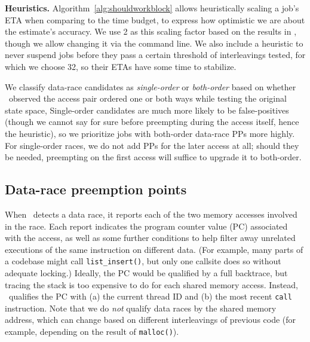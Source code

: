 {\bf Heuristics.}
Algorithm~\ref{alg:shouldworkblock} allows heuristically scaling a job's ETA when comparing to the time budget,
to express how optimistic we are about the estimate's accuracy.
We use 2 as this scaling factor based on the results in \cite{estimation},
though we allow changing it via the command line.
We also include a heuristic to
never suspend jobs before they pass a certain threshold of interleavings tested,
for which we choose 32,
so their ETAs have some time to stabilize.

We classify data-race candidates as {\em single-order} or {\em both-order} \cite{portend}
based on whether \landslide~observed the access pair ordered one or both ways while testing the original state space,
Single-order candidates are much more likely to be false-positives
(though we cannot say for sure before preempting during the access itself, hence the heuristic),
so we prioritize jobs with both-order data-race PPs more highly.
For single-order races, we do not add PPs for the later access at all;
should they be needed, preempting on the first access will suffice to upgrade it to both-order.





\subsection{Data-race preemption points}

When \landslide~detects a data race, it reports each of the two memory accesses involved in the race.
Each report indicates the program counter value (PC) associated with the access, as well as some further conditions to help filter away unrelated executions of the same instruction on different data.
(For example, many parts of a codebase might call {\tt list\_insert()}, but only one callsite does so without adequate locking.)
Ideally, the PC would be qualified by a full backtrace, but tracing the stack is too expensive to do for each shared memory access.
Instead, \landslide~qualifies the PC with
(a) the current thread ID and
(b) the most recent {\tt call} instruction.
Note that we do {\em not} qualify data races by the shared memory address,
which can change based on different interleavings of previous code
(for example, depending on the result of {\tt malloc()}).


